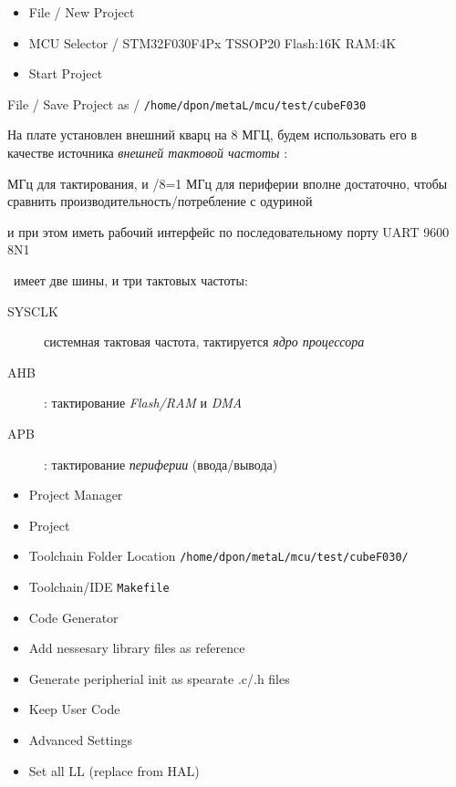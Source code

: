 \label{f030}\secdown

\begin{itemize}
  \item File / New Project
  \item MCU Selector / STM32F030F4Px TSSOP20 Flash:16K RAM:4K
  \item Start Project
\end{itemize}

File / Save Project as / \verb|/home/dpon/metaL/mcu/test/cubeF030|





На плате установлен внешний кварц на 8 МГЦ, будем использовать его в качестве
источника \emph{внешней тактовой частоты} :

\medskip
{}

 МГц для тактирования, и /8=1 МГц для периферии вполне достаточно, чтобы
сравнить производительность/потребление с одуриной

\bigskip
{}

\noindent
и при этом иметь рабочий интерфейс по последовательному порту UART 9600 8N1

\bigskip
{}

\bigskip
{}\ имеет две шины, и три тактовых частоты:
\begin{description}
\item[SYSCLK] системная тактовая частота, тактируется \emph{ядро процессора}
\item[AHB] : тактирование \emph{Flash/RAM} и \emph{DMA}
\item[APB] : тактирование \emph{периферии}
(ввода/вывода)
\end{description} 


\begin{itemize}
  \item 
Project Manager
\item Project
\item Toolchain Folder Location \verb|/home/dpon/metaL/mcu/test/cubeF030/|
\item Toolchain/IDE \verb|Makefile|
\item Code Generator
\item Add nessesary library files as reference
\item Generate peripherial init as spearate .c/.h files
\item Keep User Code
\item Advanced Settings
\item Set all LL (replace from HAL)
\end{itemize}

\secup
